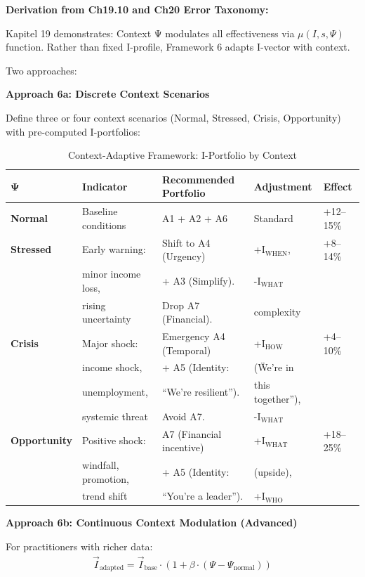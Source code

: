 \textbf{Derivation from Ch19.10 and Ch20 Error Taxonomy:}

Kapitel 19 demonstrates: Context Ψ modulates all effectiveness via $\mu(I, s, \Psi)$ function. Rather than fixed I-profile, Framework 6 adapts I-vector with context.

Two approaches:

\textbf{Approach 6a: Discrete Context Scenarios}

Define three or four context scenarios (Normal, Stressed, Crisis, Opportunity) with pre-computed I-portfolios:

\begin{table}[htbp]
\centering
\caption{Context-Adaptive Framework: I-Portfolio by Context}
\label{tab:20-f6-context}
\renewcommand{\arraystretch}{1.3}
\footnotesize
\begin{tabular}{@{}lllll@{}}
\toprule
\textbf{Ψ} & \textbf{Indicator} & \textbf{Recommended Portfolio} & \textbf{Adjustment} & \textbf{Effect} \\
\midrule
\textbf{Normal} & Baseline conditions & A1 + A2 + A6 & Standard & +12--15\% \\
\midrule
\textbf{Stressed} & Early warning: & Shift to A4 (Urgency) & +I$_{\text{WHEN}}$, & +8--14\% \\
& minor income loss, & + A3 (Simplify). & -I$_{\text{WHAT}}$ \\
& rising uncertainty & Drop A7 (Financial). & complexity & \\
\midrule
\textbf{Crisis} & Major shock: & Emergency A4 (Temporal) & +I$_{\text{HOW}}$ & +4--10\% \\
& income shock, & + A5 (Identity: & (\"We're in \\
& unemployment, & ``We're resilient''). & this together''), & \\
& systemic threat & Avoid A7. & -I$_{\text{WHAT}}$ & \\
\midrule
\textbf{Opportunity} & Positive shock: & A7 (Financial incentive) & +I$_{\text{WHAT}}$ & +18--25\% \\
& windfall, promotion, & + A5 (Identity: & (upside), & \\
& trend shift & ``You're a leader''). & +I$_{\text{WHO}}$ & \\
\bottomrule
\end{tabular}
\end{table}

\textbf{Approach 6b: Continuous Context Modulation (Advanced)}

For practitioners with richer data:
\begin{align}
\vec{I}_{\text{adapted}} = \vec{I}_{\text{base}} \cdot \left(1 + \beta \cdot (\Psi - \Psi_{\text{normal}})\right)
\end{align}

